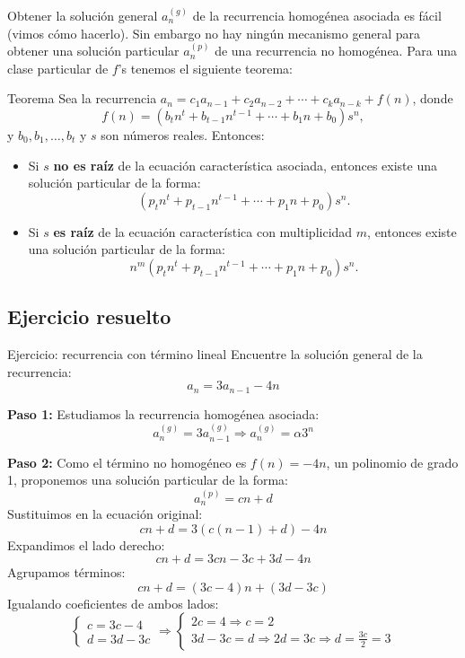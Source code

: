 Obtener la solución general $a_n^{(g)}$ de la recurrencia homogénea asociada es fácil (vimos cómo hacerlo).  Sin embargo no hay ningún mecanismo general para obtener una solución particular $a_n^{(p)}$ de una
recurrencia no homogénea. 
Para una clase particular de $f$'s tenemos el siguiente teorema:


\begin{thmblock}{Teorema}
Sea la recurrencia $a_n = c_1 a_{n-1} + c_2 a_{n-2} + \cdots + c_k a_{n-k} + f(n)$, donde
\[ f(n) = (b_t n^t + b_{t-1} n^{t-1} + \cdots + b_1 n + b_0) s^n, \]
y $b_0, b_1, \dots, b_t$ y $s$ son números reales. Entonces:

\begin{itemize}
  \item Si $s$ \textbf{no es raíz} de la ecuación característica asociada, entonces existe una solución particular de la forma:
  \[ (p_t n^t + p_{t-1} n^{t-1} + \cdots + p_1 n + p_0) s^n. \]

  \item Si $s$ \textbf{es raíz} de la ecuación característica con multiplicidad $m$, entonces existe una solución particular de la forma:
  \[ n^m (p_t n^t + p_{t-1} n^{t-1} + \cdots + p_1 n + p_0) s^n. \]

\end{itemize}
\end{thmblock}

\subsection*{Ejercicio resuelto}

\begin{exampleblock}{Ejercicio: recurrencia con término lineal}
Encuentre la solución general de la recurrencia:
\[
a_n = 3 a_{n-1} - 4n
\]
\end{exampleblock}

\noindent \textbf{Paso 1:} Estudiamos la recurrencia homogénea asociada:
\[
a_n^{(g)} = 3 a_{n-1}^{(g)} \Rightarrow a_n^{(g)} = \alpha 3^n
\]

\noindent \textbf{Paso 2:} Como el término no homogéneo es $f(n) = -4n$, un polinomio de grado 1, proponemos una solución particular de la forma:
\[
a_n^{(p)} = cn + d
\]
Sustituimos en la ecuación original:
\[
cn + d = 3(c(n-1) + d) - 4n
\]
Expandimos el lado derecho:
\[
cn + d = 3cn - 3c + 3d - 4n
\]
Agrupamos términos:
\[
cn + d = (3c - 4)n + (3d - 3c)
\]
Igualando coeficientes de ambos lados:
\[
\begin{cases}
c = 3c - 4 \\
d = 3d - 3c
\end{cases} \Rightarrow 
\begin{cases}
2c = 4 \Rightarrow c = 2 \\
3d - 3c = d \Rightarrow 2d = 3c \Rightarrow d = \frac{3c}{2} = 3
\end{cases}
\]

